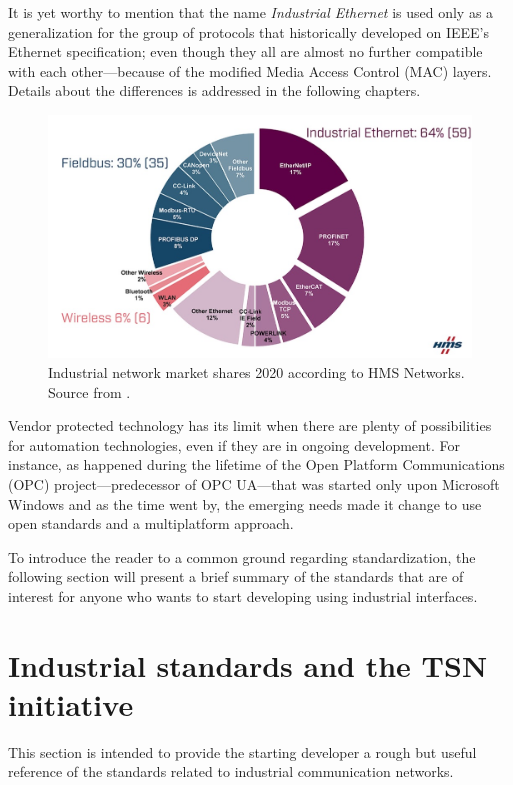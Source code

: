 It is yet worthy to mention that the name \emph{Industrial Ethernet} is used only as a 
generalization for the group of protocols that historically developed on IEEE's Ethernet specification; even though they all are almost no further
compatible with each other---because of the modified Media Access Control (MAC) layers. 
Details about the differences is addressed in the following chapters.  

\begin{figure}[h]
    \centering
    \includegraphics[width=.8\textwidth]{imgs/intro-buses-share.jpg}
    \caption{Industrial network market shares 2020 according to HMS Networks. Source from \cite{fieldbus_shares}.} %
    \label{fig:fieldbus_shares}
\end{figure}

Vendor protected technology has its limit when there are plenty of possibilities for automation technologies, even if they are in ongoing development. 
For instance, as happened during the lifetime of the Open Platform Communications (OPC) project---predecessor of OPC UA---that was started only upon Microsoft Windows and 
as the time went by, the emerging needs made it change to use open standards and a multiplatform approach.

To introduce the reader to a common ground regarding standardization, the following section will present a brief summary of the standards that 
are of interest for anyone who wants to start developing using industrial interfaces.

\section{Industrial standards and the TSN initiative}\label{sec:standards} 

This section is intended to provide the starting developer a rough but useful reference of the standards related to industrial 
communication networks. 

